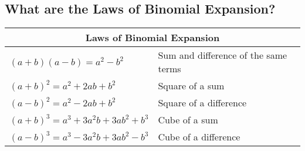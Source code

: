 \subsection{What are the Laws of Binomial Expansion?}

\begin{small}
    \begin{tabularx}{1\textwidth}{
            p{}
            p{}
        }
        \toprule
        \multicolumn{2}{c}{\textbf{Laws of Binomial Expansion}} \\
        \midrule

        $ \left(a + b \right)\left(a - b \right) = a^{2} - b^{2} $
        &
        Sum and difference of the same terms
        \\
        \midrule

        $ \left(a + b \right)^{2} = a^{2} + 2ab + b^{2} $
        &
        Square of a sum
        \\
        \midrule

        $ \left(a - b \right)^{2} = a^{2} - 2ab + b^{2} $
        &
        Square of a difference
        \\
        \midrule

        $ \left(a + b \right)^{3} = a^{3} + 3a^{2}b + 3ab^{2} + b^{3} $
        &
        Cube of a sum
        \\
        \midrule

        $ \left(a - b \right)^{3} = a^{3} - 3a^{2}b + 3ab^{2} - b^{3} $
        &
        Cube of a difference
        \\
        \bottomrule

    \end{tabularx}
\end{small}
